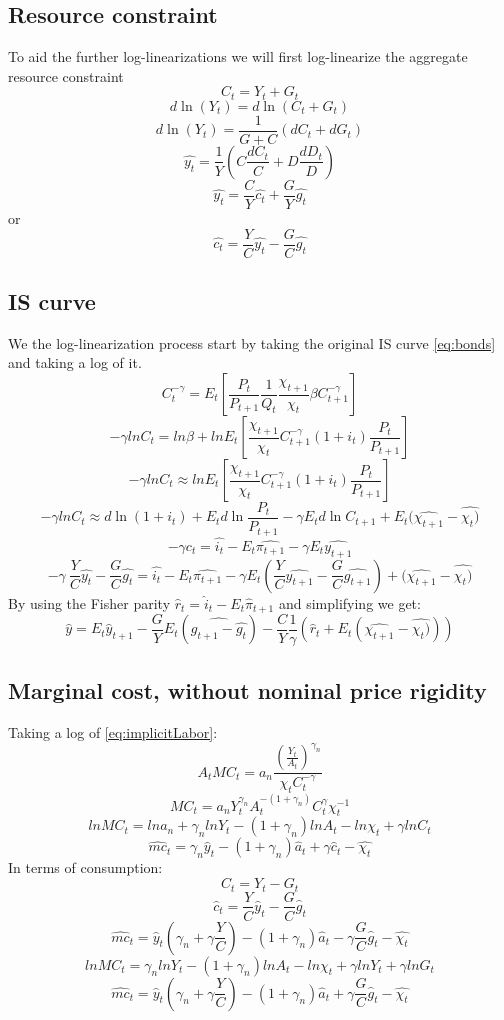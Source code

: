 \documentclass[10pt,a4paper]{article}
\begin{document}
\subsection{Resource constraint}
To aid the further log-linearizations we will first log-linearize the aggregate resource constraint
$$ C_t = Y_t + G_t $$
$$ d\ln(Y_t) = d\ln(C_t+G_t) $$
$$ d\ln(Y_t) = \frac{1}{G+C}(dC_t + dG_t)$$
$$ \hat{y_t} = \frac{1}{Y}(C\frac{dC_t}{C}+D\frac{dD_t}{D})$$
$$ \hat{y_t} = \frac{C}{Y}\hat{c_t}+\frac{G}{Y}\hat{g_t}$$
or
$$ \hat{c_t} = \frac{Y}{C}\hat{y_t}-\frac{G}{C}\hat{g_t}$$
\subsection{IS curve}
We the log-linearization process start by taking the original IS curve \eqref{eq:bonds} and taking a log of it.
$$C_t^{-\gamma}= E_t \left[ \frac{P_t}{P_{t+1}} \frac{1}{Q_t} \frac{\chi_{t+1}}{\chi_t} \beta C_{t+1}^{-\gamma}\right]$$
$$-\gamma lnC_{t}=ln\beta+lnE_{t}\left[\frac{\chi_{t+1}}{\chi_{t}}C_{t+1}^{-\gamma}(1+i_{t})\frac{P_{t}}{P_{t+1}}\right]$$
$$-\gamma lnC_{t}\approx lnE_{t}\left[\frac{\chi_{t+1}}{\chi_{t}}C_{t+1}^{-\gamma}(1+i_{t})\frac{P_{t}}{P_{t+1}}\right]$$
$$-\gamma ln C_{t} \approx d\ln(1+i_t) + E_t d \ln \frac{P_t}{P_{t+1}} -\gamma E_t d \ln C_{t+1} + E_t (\hat{\chi_{t+1}} - \hat{\chi_t)}$$
$$-\gamma\hat{c_t} = \hat{i_t} - E_{t} \hat{\pi_{t+1}} -\gamma E_t \hat{y_{t+1}}$$
$$-\gamma\ \frac{Y}{C}\hat{y_t} - \frac{G}{C} \hat{g_t}= \hat{i_t} - E_{t} \hat{\pi_{t+1}} -\gamma E_t (\frac{Y}{C}\hat{y_{t+1}} - \frac{G}{C} \hat{g_{t+1}}) + (\hat{\chi_{t+1}} - \hat{\chi_t)}$$
By using the Fisher parity $\hat{r}_{t}=\hat{i}_{t}-E_{t}\hat{\pi}_{t+1}$ and simplifying we get:
\begin{equation}\label{eq:ISloglin}
\hat{y}=E_{t}\hat{y}_{t+1}-\frac{G}{Y}E_{t}(\hat{g_{t+1}-\hat{g_t}})-\frac{C}{Y}\frac{1}{\gamma}\left(\hat{r}_{t}+E_{t}(\hat{\chi_{t+1}} - \hat{\chi_t)})\right)
\end{equation}
\subsection{Marginal cost, without nominal price rigidity}
Taking a log of \eqref{eq:implicitLabor}:
$$A_{t}MC_{t}=a_{n}\frac{\left(\frac{Y_{t}}{A_{t}}\right)^{\gamma_{n}}}{\chi_{t} C_{t}^{-\gamma}}$$
$$MC_{t}=a_{n}Y_{t}^{\gamma_{n}}A_{t}^{-\left(1+\gamma_{n}\right)}C_{t}^{\gamma}\chi_{t}^{-1}$$
$$ln{MC}_{t}=ln a_{n} + \gamma_{n}ln {Y}_{t}-\left(1+\gamma_{n}\right)ln {A}_{t}- ln \chi_{t} + \gamma ln C_{t}$$
$$\hat{mc}_{t}=\gamma_{n}\hat{y}_{t}-\left(1+\gamma_{n}\right)\hat{a}_{t}+\gamma\hat{c}_{t}-\hat{\chi_{t}}$$
In terms of consumption:
$$C_{t}=Y_{t}-G_{t}$$
$$\hat{c}_{t}=\frac{Y}{C}\hat{y}_{t}-\frac{G}{C}\hat{g}_{t}$$
$$ \hat{mc}_{t}=\hat{y}_{t}\left(\gamma_{n}+\gamma\frac{Y}{C}\right)-\left(1+\gamma_{n}\right)\hat{a}_{t}-\gamma\frac{G}{C}\hat{g}_{t}-\hat{\chi_{t}}$$
$$ln{MC}_{t}=\gamma_{n}ln {Y}_{t}-\left(1+\gamma_{n}\right)ln {A}_{t}- ln \chi_{t} + \gamma ln Y_{t} +  \gamma ln G_{t}$$
\begin{equation}\label{realMClin_old} 
\hat{mc}_{t}=\hat{y}_{t}\left(\gamma_{n}+\gamma\frac{Y}{C}\right)-\left(1+\gamma_{n}\right)\hat{a}_{t}+\gamma\frac{G}{C}\hat{g}_{t}-\hat{\chi_{t}}
\end{equation}
\end{document}
